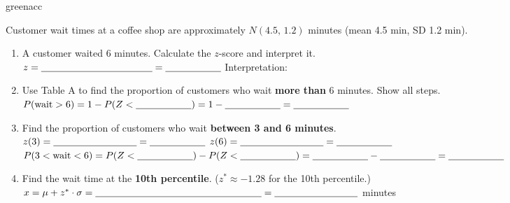 \documentclass[10pt]{article}
\begin{document}
\vspace{0.12in}

\begin{blurbbox}{greenacc}
\small

Customer wait times at a coffee shop are approximately $N(4.5,\,1.2)$ minutes
(mean 4.5 min, SD 1.2 min).

\vspace{0.10in}

\begin{enumerate}[leftmargin=1.5em, itemsep=8pt]

  \item A customer waited 6 minutes. Calculate the $z$-score and interpret it.\\[5pt]
        $z = \blank{4cm} = \blank{2cm}$\quad
        Interpretation: \writeline

  \item Use Table A to find the proportion of customers who wait \textbf{more than}
        6 minutes. Show all steps.\\[5pt]
        $P(\text{wait} > 6) = 1 - P(Z < \blank{2cm}) = 1 - \blank{2cm} = \blank{2cm}$

  \item Find the proportion of customers who wait \textbf{between 3 and 6 minutes}.\\[5pt]
        $z(3) = \blank{3cm} = \blank{2cm}$\quad
        $z(6) = \blank{3cm} = \blank{2cm}$\\[4pt]
        $P(3 < \text{wait} < 6) = P(Z < \blank{2cm}) - P(Z < \blank{2cm}) = \blank{2cm} - \blank{2cm} = \blank{2cm}$

  \item Find the wait time at the \textbf{10th percentile}.
        ($z^* \approx -1.28$ for the 10th percentile.)\\[5pt]
        $x = \mu + z^* \cdot \sigma = \blank{6cm} = \blank{3cm}$ minutes

\end{enumerate}

\end{blurbbox}

\vspace{0.12in}
\end{document}
